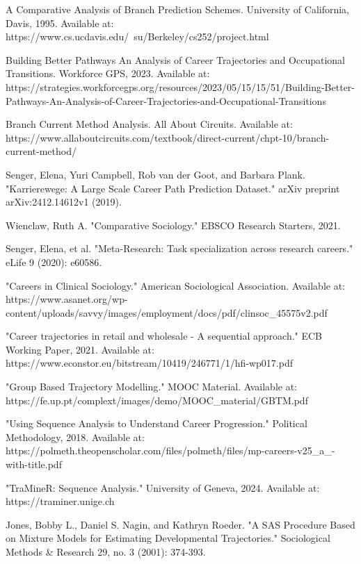 \documentclass[main.tex]{subfiles}
\begin{document}
\begin{thebibliography}{20}

 A Comparative Analysis of Branch Prediction Schemes. University of California, Davis, 1995. Available at: https://www.cs.ucdavis.edu/~su/Berkeley/cs252/project.html

 Building Better Pathways An Analysis of Career Trajectories and Occupational Transitions. Workforce GPS, 2023. Available at: https://strategies.workforcegps.org/resources/2023/05/15/15/51/Building-Better-Pathways-An-Analysis-of-Career-Trajectories-and-Occupational-Transitions

 Branch Current Method Analysis. All About Circuits. Available at: https://www.allaboutcircuits.com/textbook/direct-current/chpt-10/branch-current-method/

 Senger, Elena, Yuri Campbell, Rob van der Goot, and Barbara Plank. "Karrierewege: A Large Scale Career Path Prediction Dataset." arXiv preprint arXiv:2412.14612v1 (2019).

 Wienclaw, Ruth A. "Comparative Sociology." EBSCO Research Starters, 2021.

 Senger, Elena, et al. "Meta-Research: Task specialization across research careers." eLife 9 (2020): e60586.

 "Careers in Clinical Sociology." American Sociological Association. Available at: https://www.asanet.org/wp-content/uploads/savvy/images/employment/docs/pdf/clinsoc\_45575v2.pdf

 "Career trajectories in retail and wholesale - A sequential approach." ECB Working Paper, 2021. Available at: https://www.econstor.eu/bitstream/10419/246771/1/hfi-wp017.pdf

 "Group Based Trajectory Modelling." MOOC Material. Available at: https://fe.up.pt/complext/images/demo/MOOC\_material/GBTM.pdf

 "Using Sequence Analysis to Understand Career Progression." Political Methodology, 2018. Available at: https://polmeth.theopenscholar.com/files/polmeth/files/mp-careers-v25\_a\_-with-title.pdf

 "TraMineR: Sequence Analysis." University of Geneva, 2024. Available at: https://traminer.unige.ch

 Jones, Bobby L., Daniel S. Nagin, and Kathryn Roeder. "A SAS Procedure Based on Mixture Models for Estimating Developmental Trajectories." Sociological Methods \& Research 29, no. 3 (2001): 374-393.


\end{thebibliography}
\end{document}
